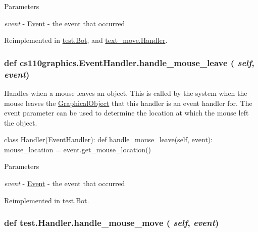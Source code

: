 \begin{DoxyParams}{Parameters}
\item[{\em event}]-\/ \hyperlink{classcs110graphics_1_1Event}{Event} -\/ the event that occurred \end{DoxyParams}


Reimplemented in \hyperlink{classtest_1_1Bot_a0b184ab86d0dd6121e55394a24c8751e}{test.Bot}, and \hyperlink{classtext__move_1_1Handler_a51652a1d51554e661117de1ee7856169}{text\_\-move.Handler}.\hypertarget{classcs110graphics_1_1EventHandler_a5deaf2b6b8055e97ac0ddf6603132c64}{
\subsubsection[{handle\_\-mouse\_\-leave}]{\setlength{\rightskip}{0pt plus 5cm}def cs110graphics.EventHandler.handle\_\-mouse\_\-leave ( {\em self}, \/   {\em event})}}
\label{classcs110graphics_1_1EventHandler_a5deaf2b6b8055e97ac0ddf6603132c64}


Handles when a mouse leaves an object. This is called by the system when the mouse leaves the \hyperlink{classcs110graphics_1_1GraphicalObject}{GraphicalObject} that this handler is an event handler for. The event parameter can be used to determine the location at which the mouse left the object. 
\begin{DoxyCode}
 class Handler(EventHandler):
     def handle_mouse_leave(self, event):
         mouse_location = event.get_mouse_location()
\end{DoxyCode}
 
\begin{DoxyParams}{Parameters}
\item[{\em event}]-\/ \hyperlink{classcs110graphics_1_1Event}{Event} -\/ the event that occurred \end{DoxyParams}


Reimplemented in \hyperlink{classtest_1_1Bot_a2b65e6ecaba1afb4f117b74a684b4387}{test.Bot}.\hypertarget{classtest_1_1Handler_a88a2d58962eb4bf7338332848fa5fc3a}{
\subsubsection[{handle\_\-mouse\_\-move}]{\setlength{\rightskip}{0pt plus 5cm}def test.Handler.handle\_\-mouse\_\-move ( {\em self}, \/   {\em event})}}
\label{classtest_1_1Handler_a88a2d58962eb4bf7338332848fa5fc3a}


